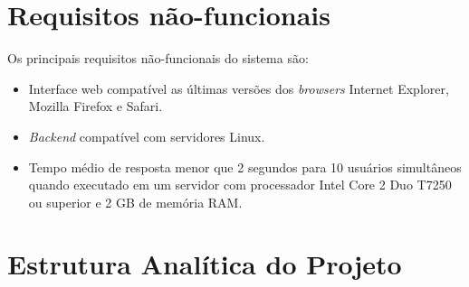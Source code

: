 \documentclass[]{article}
\begin{document}

\section{Requisitos não-funcionais} %

Os principais requisitos não-funcionais do sistema são:

\begin{itemize}

    \item Interface web compatível as últimas versões dos \textit{browsers} Internet Explorer, Mozilla Firefox e Safari.
    
    \item \textit{Backend} compatível com servidores Linux.

    \item Tempo médio de resposta menor que 2 segundos para 10 usuários simultâneos quando executado em um servidor com processador Intel Core 2 Duo T7250 ou superior e 2 GB de memória RAM. %

\end{itemize}

\section{Estrutura Analítica do Projeto} %
\label{sec:estrutura_analitica_do_projeto}
\end{document}
